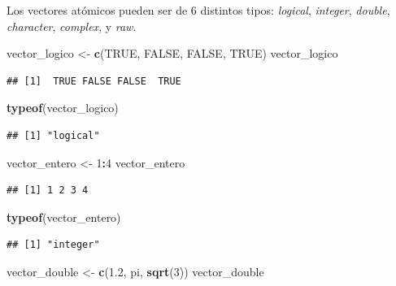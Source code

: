 \documentclass[]{book}
\newenvironment{Shaded}{\begin{snugshade}}{\end{snugshade}}
\newcommand{\KeywordTok}[1]{\textcolor[rgb]{0.13,0.29,0.53}{\textbf{#1}}}
\newcommand{\DecValTok}[1]{\textcolor[rgb]{0.00,0.00,0.81}{#1}}
\newcommand{\FloatTok}[1]{\textcolor[rgb]{0.00,0.00,0.81}{#1}}
\newcommand{\StringTok}[1]{\textcolor[rgb]{0.31,0.60,0.02}{#1}}
\newcommand{\OtherTok}[1]{\textcolor[rgb]{0.56,0.35,0.01}{#1}}
\newcommand{\OperatorTok}[1]{\textcolor[rgb]{0.81,0.36,0.00}{\textbf{#1}}}
\newcommand{\NormalTok}[1]{#1}
\theoremstyle{definition}
\theoremstyle{definition}
\theoremstyle{definition}
\theoremstyle{remark}
\begin{document}
Los vectores atómicos pueden ser de 6 distintos tipos: \emph{logical},
\emph{integer}, \emph{double}, \emph{character}, \emph{complex}, y
\emph{raw}.

\begin{Shaded}
\begin{Highlighting}[]
\NormalTok{vector_logico <-}\StringTok{ }\KeywordTok{c}\NormalTok{(}\OtherTok{TRUE}\NormalTok{, }\OtherTok{FALSE}\NormalTok{, }\OtherTok{FALSE}\NormalTok{, }\OtherTok{TRUE}\NormalTok{)}
\NormalTok{vector_logico}
\end{Highlighting}
\end{Shaded}

\begin{verbatim}
## [1]  TRUE FALSE FALSE  TRUE
\end{verbatim}

\begin{Shaded}
\begin{Highlighting}[]
\KeywordTok{typeof}\NormalTok{(vector_logico)}
\end{Highlighting}
\end{Shaded}

\begin{verbatim}
## [1] "logical"
\end{verbatim}

\begin{Shaded}
\begin{Highlighting}[]
\NormalTok{vector_entero <-}\StringTok{ }\DecValTok{1}\OperatorTok{:}\DecValTok{4}
\NormalTok{vector_entero}
\end{Highlighting}
\end{Shaded}

\begin{verbatim}
## [1] 1 2 3 4
\end{verbatim}

\begin{Shaded}
\begin{Highlighting}[]
\KeywordTok{typeof}\NormalTok{(vector_entero)}
\end{Highlighting}
\end{Shaded}

\begin{verbatim}
## [1] "integer"
\end{verbatim}

\begin{Shaded}
\begin{Highlighting}[]
\NormalTok{vector_double <-}\StringTok{ }\KeywordTok{c}\NormalTok{(}\FloatTok{1.2}\NormalTok{, pi, }\KeywordTok{sqrt}\NormalTok{(}\DecValTok{3}\NormalTok{)) }
\NormalTok{vector_double}
\end{Highlighting}
\end{Shaded}
\end{document}
